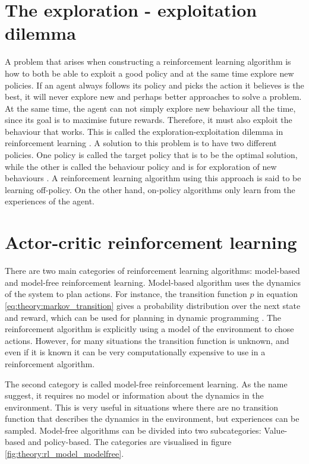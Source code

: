 \documentclass[class=book, crop=false]{standalone}
\begin{document}
\section{The exploration - exploitation dilemma}
A problem that arises when constructing a reinforcement learning algorithm is how to both be able to exploit a good policy and at the same time explore new policies. If an agent always follows its policy and picks the action it believes is the best, it will never explore new and perhaps better approaches to solve a problem. At the same time, the agent can not simply explore new behaviour all the time, since its goal is to maximise future rewards. Therefore, it must also exploit the behaviour that works. This is called the exploration-exploitation dilemma in reinforcement learning \cite{Sutton1998}. A solution to this problem is to have two different policies. One policy is called the target policy that is to be the optimal solution, while the other is called the behaviour policy and is for exploration of new behaviours \cite{Sutton1998}. A reinforcement learning algorithm using this approach is said to be learning off-policy. On the other hand, on-policy algorithms only learn from the experiences of the agent.

\section{Actor-critic reinforcement learning}
There are two main categories of reinforcement learning algorithms: model-based and model-free reinforcement learning. Model-based algorithm uses the dynamics of the system to plan actions. For instance, the transition function $p$ in equation \eqref{eq:theory:markov_transition}  gives a probability distribution over the next state and reward, which can be used for planning in dynamic programming \cite{silver_course}. The reinforcement algorithm is explicitly using a model of the environment to chose actions. However, for many situations the transition function is unknown, and even if it is known it can be very computationally expensive to use in a reinforcement algorithm.

The second category is called model-free reinforcement learning. As the name suggest, it requires no model or information about the dynamics in the environment. This is very useful in situations where there are no transition function that describes the dynamics in the environment, but experiences can be sampled. Model-free algorithms can be divided into two subcategories: Value-based and policy-based. The categories are visualised in figure \ref{fig:theory:rl_model_modelfree}.
\end{document}
